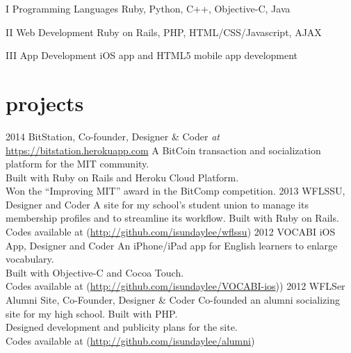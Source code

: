 \documentclass[]{friggeri-cv} %
\begin{document}
\begin{entrylist}
  \entry
  {I}
  {Programming Languages}
  {}
  {Ruby, Python, C++, Objective-C, Java}

  \entry
  {II}
  {Web Development}
  {}
  {Ruby on Rails, PHP, HTML/CSS/Javascript, AJAX}

  \entry
  {III}
  {App Development}
  {}
  {iOS app and HTML5 mobile app development}
\end{entrylist}


\section{projects}

\begin{entrylist}
  \entry
  {2014}
  {BitStation, Co-founder, Designer \& Coder \textnormal{\textit{at}} \href{https://bitstation.herokuapp.com}{https://bitstation.herokuapp.com}}
  {}
  {A BitCoin transaction and socialization platform for the MIT community. \\
  Built with Ruby on Rails and Heroku Cloud Platform. \\
  Won the ``Improving MIT'' award in the BitComp competition. }
  \entry
  {2013}
  {WFLSSU, Designer and Coder}
  {}
  {A site for my school's student union to manage its membership profiles and to streamline its workflow. Built with Ruby on Rails. \\
  Codes available at (\href{http://github.com/isundaylee/wflssu}{http://github.com/isundaylee/wflssu})}
  \entry
  {2012}
  {VOCABI iOS App, Designer and Coder}
  {}
  {An iPhone/iPad app for English learners to enlarge vocabulary. \\
  Built with Objective-C and Cocoa Touch. \\
  Codes available at (\href{http://github.com/isundaylee/VOCABI-ios}{http://github.com/isundaylee/VOCABI-ios}))}
  \entry
  {2012}
  {WFLSer Alumni Site, Co-Founder, Designer \& Coder}
  {}
  {Co-founded an alumni socializing site for my high school. Built with PHP. \\
  Designed development and publicity plans for the site. \\
  Codes available at (\href{http://github.com/isundaylee/alumni}{http://github.com/isundaylee/alumni})}
\end{entrylist}
\end{document}
